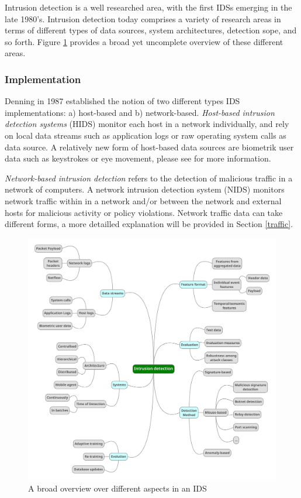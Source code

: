 \documentclass[a4paper,12pt,twoside]{report}
\begin{document}
Intrusion detection is a well researched area, with the first IDSs emerging in the late 1980's. Intrusion detection today comprises a variety of research areas in terms of different types of data sources, system architectures, detection sope, and so forth. Figure \ref{graph} provides a broad yet uncomplete overview of these different areas. 


\subsubsection*{Implementation}

Denning \cite{denning1987intrusion} in 1987 established the notion of two different types IDS implementations: a) host-based and b) network-based. 
\textit{Host-based intrusion detection systems} (HIDS) monitor each host in a network individually, and rely on local data streams such as application logs or raw operating system calls as  data source. A relatively new form of host-based data sources are biometrik user data such as keystrokes or eye movement, please see \cite{peng_user_2016} for more information.

\textit{Network-based intrusion detection} refers to the detection of malicious traffic in a network of computers. A network intrusion detection system (NIDS) monitors network traffic within in a network and/or between the network and external hosts for malicious activity or policy violations. Network traffic data can take different forms, a more detailled explanation will be provided in Section \ref{traffic}.

\begin{figure}\label{graph}
\centering
\includegraphics[scale=0.25]{Graphic2.pdf}
\caption{A broad overview over different aspects in an IDS}
\end{figure}
\end{document}
